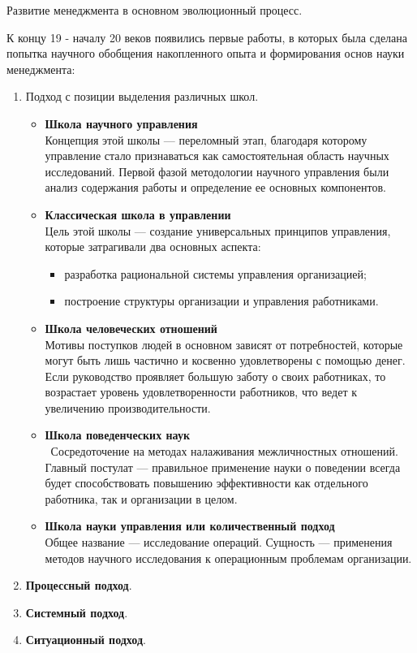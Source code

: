 \documentclass[a4paper,12pt,oneside,final]{extarticle}
\numberwithin{equation}{section}
\begin{document}
Развитие менеджмента в основном эволюционный процесс.

К концу 19 - началу 20 веков  появились первые работы, в которых была сделана попытка научного обобщения накопленного опыта  и формирования основ науки менеджмента:
\begin{enumerate}
	\item Подход с позиции выделения различных школ.
	\begin{itemize}
		\item \textbf{Школа научного управления} \\
		Концепция этой школы --- переломный этап, благодаря которому управление стало признаваться как самостоятельная область научных исследований. 
		Первой фазой методологии научного управления были анализ содержания работы и определение ее основных компонентов.
		\item \textbf{Классическая школа в управлении} \\
		Цель этой школы --- создание универсальных принципов управления, которые затрагивали два основных аспекта:
		\begin{itemize}
			\item разработка рациональной системы управления организацией; 
			\item построение структуры организации и управления работниками.
		\end{itemize}
		\item \textbf{Школа человеческих отношений} \\
		Мотивы поступков людей в основном зависят от потребностей, которые могут быть лишь частично и косвенно удовлетворены с помощью денег. 
		Если руководство проявляет большую заботу о своих работниках, то возрастает уровень удовлетворенности работников, что ведет к увеличению производительности.
		\item \textbf{Школа поведенческих наук} \\\
		Сосредоточение на методах налаживания межличностных отношений. 
		Главный постулат --- правильное применение науки о поведении всегда будет способствовать повышению эффективности как отдельного работника, так и организации в целом.
		\item \textbf{Школа науки управления или количественный подход} \\ 
		Общее название --- исследование операций. 
		Сущность --- применения методов научного исследования к операционным проблемам организации.
	\end{itemize}
	\item \textbf{Процессный подход}.
	\item \textbf{Системный подход}.
	\item \textbf{Ситуационный подход}.
\end{enumerate}
\end{document}
